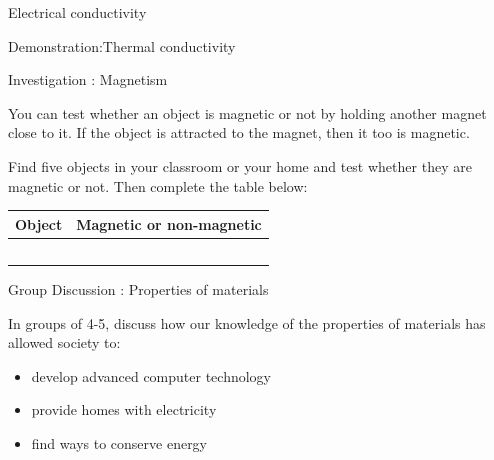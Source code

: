 \begin{iexperiment}{Electrical conductivity}
\begin{gexperiment}{Demonstration:Thermal conductivity}
\begin{gexperiment}{Investigation : Magnetism}
{            \nopagebreak
      \label{m38706*id67220}You can test whether an object is magnetic or not by holding another magnet close to it. If the object is attracted to the magnet, then it too is magnetic.\par 
      \label{m38706*id67227}Find five objects in your classroom or your home and test whether they are magnetic or not. Then complete the table below:\par 
          \begin{table}[H]
        \begin{center}
      \label{m38706*id67234}
    \noindent
      \begin{tabular}{|l|l|}\hline
                \textbf{Object}
               &
                \textbf{Magnetic or non-magnetic} \\ \hline
         & \\ \hline
         & \\ \hline
         & \\ \hline
         & \\ \hline
         & \\ \hline
    \end{tabular}
      \end{center}
\end{table}}
\end{gexperiment}
    \par
\label{m38706*secfhsst!!!underscore!!!id616}
            \begin{groupdiscussion}{Group Discussion : Properties of materials}{
            \nopagebreak
      \label{m38706*id67392}In groups of 4-5, discuss how our knowledge of the properties of materials has allowed society to:\par 
      \label{m38706*id67398}\begin{itemize}[noitemsep]
            \label{m38706*uid111}\item develop advanced computer technology
\label{m38706*uid112}\item provide homes with electricity
\label{m38706*uid113}\item find ways to conserve energy

\end{itemize}}
\end{groupdiscussion}
\end{gexperiment}
\end{iexperiment}
